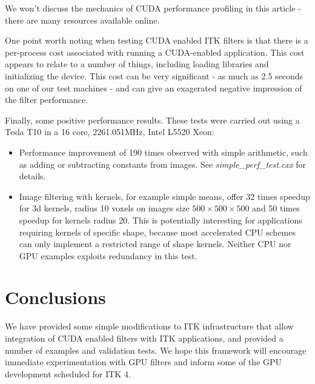 \documentclass{InsightArticle}
\begin{document}
We won't discuss the mechanics of CUDA performance profiling in this
article - there are many resources available online.

One point worth noting when testing CUDA enabled ITK filters is that
there is a per-process cost associated with running a CUDA-enabled
application. This cost appears to relate to a number of things,
including loading libraries and initializing the device. This cost can
be very significant - as much as 2.5 seconds on one of our test
machines - and can give an exagerated negative impression of the  filter
performance.

Finally, some positive performance results. These tests were carried
out using a Tesla T10 in a 16 core, 2261.051MHz, Intel L5520  Xeon:
\begin{itemize}
\item Performance improvement of 190 times observed with simple arithmetic, such as adding or subtracting constants from
  images. See {\em simple\_perf\_test.cxx} for details.
\item Image filtering with kernels, for example simple means, offer 32
  times speedup for 3d kernels, radius 10 voxels on images size $500
  \times 500 \times 500$ and 50 times speedup for kernels radius
  20. This is potentially interesting for applications requiring
  kernels of specific shape, because most accelerated CPU schemes can
  only implement a restricted range of shape kernels. Neither CPU nor
  GPU examples exploits redundancy in this test.
\end{itemize}


\section{Conclusions}
We have provided some simple modifications to ITK infrastructure that
allow integration of CUDA enabled filters with ITK applications, and
provided a number of examples and validation tests. We hope this
framework will encourage immediate experimentation with GPU filters
and inform some of the GPU development scheduled for ITK 4.


%

\nocite{ITKSoftwareGuide}
\end{document}
